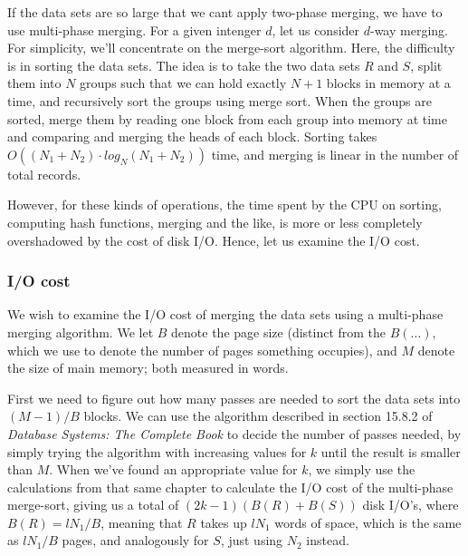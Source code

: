 \documentclass[a4paper, 12pt]{article}
\begin{document}
If the data sets are so large that we cant apply two-phase merging, we
have to use multi-phase merging. For a given intenger $d$, let us
consider $d$-way merging. For simplicity, we'll concentrate on the
merge-sort algorithm. Here, the difficulty is in sorting the data
sets. The idea is to take the two data sets $R$ and $S$, split them
into $N$ groups such that we can hold exactly $N+1$ blocks in memory
at a time, and recursively sort the groups using merge sort. When the
groups are sorted, merge them by reading one block from each group
into memory at time and comparing and merging the heads of each
block. Sorting takes $O((N_1 + N_2) \cdot log_N(N_1 + N_2))$ time, and
merging is linear in the number of total records.

However, for these kinds of operations, the time spent by the CPU on
sorting, computing hash functions, merging and the like, is more or
less completely overshadowed by the cost of disk I/O. Hence, let us
examine the I/O cost.

\subsubsection*{I/O cost}


We wish to examine the I/O cost of merging the data sets using a
multi-phase merging algorithm. We let $B$ denote the page size
(distinct from the $B(\ldots)$, which we use to denote the number of
pages something occupies), and $M$ denote the size of main memory;
both measured in words.

First we need to figure out how many passes are needed to sort the
data sets into $(M-1)/B$ blocks. We can use the algorithm described in
section 15.8.2 of \emph{Database Systems: The Complete Book} to decide
the number of passes needed, by simply trying the algorithm with
increasing values for $k$ until the result is smaller than $M$. When
we've found an appropriate value for $k$, we simply use the
calculations from that same chapter to calculate the I/O cost of the
multi-phase merge-sort, giving us a total of $(2k-1)(B(R) + B(S))$
disk I/O's, where $B(R) = lN_1 / B$, meaning that $R$ takes up $lN_1$
words of space, which is the same as $lN_1 / B$ pages, and analogously
for $S$, just using $N_2$ instead.
\end{document}
